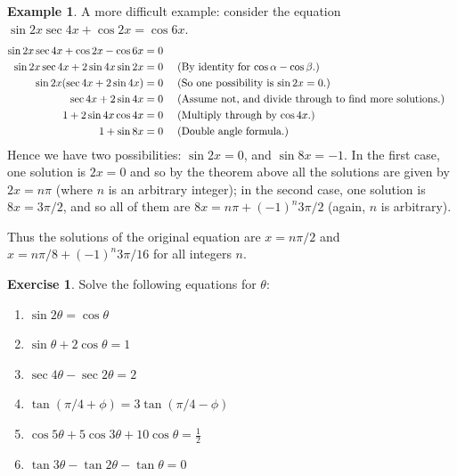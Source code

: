 \documentclass[a4paper,leqno]{article}
\numberwithin{equation}{section}
\theoremstyle{definition}
\newtheorem{ex}[equation]{Example}
\newtheorem{exercise}[equation]{Exercise}
\theoremstyle{remark}
\begin{document}
\begin{ex}
  A more difficult example: consider the equation $ \sin 2x \sec 4x + \cos 2x = \cos 6x $.
  \begin{align*}
    \sin 2x \sec 4x + \cos 2x - \cos 6x &= 0\\
    \sin 2x \sec 4x + 2\sin 4x \sin 2x &= 0 && \text{ (By identity for $ \cos \alpha - \cos \beta $.)}\\
    \sin 2x (\sec 4x + 2\sin 4x) &= 0 && \text{ (So one possibility is $ \sin 2x = 0 $.)}\\
    \sec 4x + 2\sin 4x &= 0 && \text{ (Assume not, and divide through to find more solutions.)}\\
    1 + 2\sin 4x \cos 4x &= 0 && \text{ (Multiply through by $ \cos 4x $.)}\\
    1 + \sin 8x &= 0 && \text{ (Double angle formula.)}
  \end{align*}
  Hence we have two possibilities: $ \sin 2x = 0 $, and $ \sin 8x = -1 $. In the first case, one solution is $ 2x = 0 $
  and so by the theorem above all the solutions are given by $ 2x = n\pi $ (where $ n $ is an arbitrary integer); in the
  second case, one solution is $ 8x = 3\pi/2 $, and so all of them are $ 8x = n\pi + (-1)^n 3\pi/2 $ (again, $ n $ is arbitrary).

  Thus the solutions of the original equation are $ x = n\pi/2 $ and $ x = n\pi/8 + (-1)^n 3\pi/16 $ for all integers $ n $.
\end{ex}

\begin{exercise}
  Solve the following equations for $ \theta $:
  \begin{enumerate}
    \item $ \sin 2\theta = \cos \theta $
    \item $ \sin \theta + 2\cos \theta = 1 $
    \item $ \sec 4\theta - \sec 2\theta = 2 $
    \item $ \tan(\pi/4 + \phi) = 3\tan(\pi/4 - \phi) $
    \item $ \cos 5\theta + 5\cos 3\theta + 10\cos \theta = \frac{1}{2} $
    \item $ \tan 3\theta - \tan 2\theta - \tan \theta = 0 $
  \end{enumerate}
\end{exercise}
\end{document}
